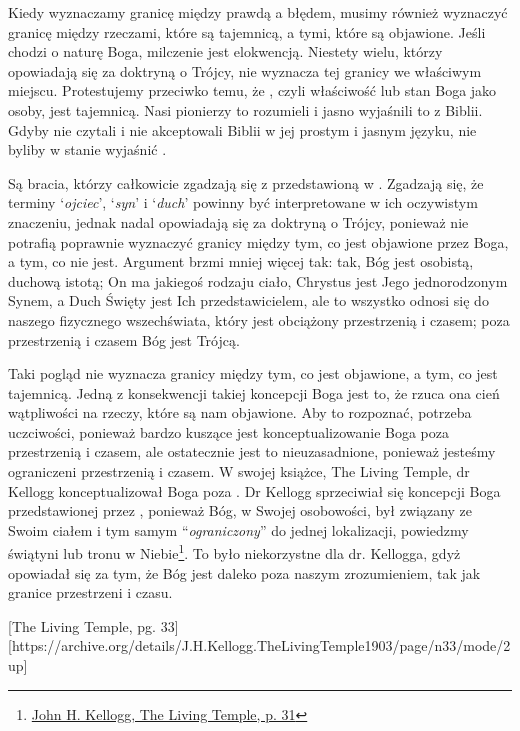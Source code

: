 Kiedy wyznaczamy granicę między prawdą a błędem, musimy również wyznaczyć granicę między rzeczami, które są tajemnicą, a tymi, które są objawione. Jeśli chodzi o naturę Boga, milczenie jest elokwencją. Niestety wielu, którzy opowiadają się za doktryną o Trójcy, nie wyznacza tej granicy we właściwym miejscu. Protestujemy przeciwko temu, że , czyli właściwość lub stan Boga jako osoby, jest tajemnicą. Nasi pionierzy to rozumieli i jasno wyjaśnili to z Biblii. Gdyby nie czytali i nie akceptowali Biblii w jej prostym i jasnym języku, nie byliby w stanie wyjaśnić .

Są bracia, którzy całkowicie zgadzają się z  przedstawioną w . Zgadzają się, że terminy ‘\textit{ojciec}’, ‘\textit{syn}’ i ‘\textit{duch}’ powinny być interpretowane w ich oczywistym znaczeniu, jednak nadal opowiadają się za doktryną o Trójcy, ponieważ nie potrafią poprawnie wyznaczyć granicy między tym, co jest objawione przez Boga, a tym, co nie jest. Argument brzmi mniej więcej tak: tak, Bóg jest osobistą, duchową istotą; On ma jakiegoś rodzaju ciało, Chrystus jest Jego jednorodzonym Synem, a Duch Święty jest Ich przedstawicielem, ale to wszystko odnosi się do naszego fizycznego wszechświata, który jest obciążony przestrzenią i czasem; poza przestrzenią i czasem Bóg jest Trójcą.

Taki pogląd nie wyznacza granicy między tym, co jest objawione, a tym, co jest tajemnicą. Jedną z konsekwencji takiej koncepcji Boga jest to, że rzuca ona cień wątpliwości na rzeczy, które są nam objawione. Aby to rozpoznać, potrzeba uczciwości, ponieważ bardzo kuszące jest konceptualizowanie Boga poza przestrzenią i czasem, ale ostatecznie jest to nieuzasadnione, ponieważ jesteśmy ograniczeni przestrzenią i czasem. W swojej książce, The Living Temple, dr Kellogg konceptualizował Boga poza . Dr Kellogg sprzeciwiał się koncepcji Boga przedstawionej przez , ponieważ Bóg, w Swojej osobowości, był związany ze Swoim ciałem i tym samym “\textit{ograniczony}” do jednej lokalizacji, powiedzmy świątyni lub tronu w Niebie\footnote{\href{https://archive.org/details/J.H.Kellogg.TheLivingTemple1903/page/n31/mode/2up}{John H. Kellogg, The Living Temple, p. 31}}. To było niekorzystne dla dr. Kellogga, gdyż opowiadał się za tym, że Bóg jest daleko poza naszym zrozumieniem, tak jak granice przestrzeni i czasu.

[The Living Temple, pg. 33][https://archive.org/details/J.H.Kellogg.TheLivingTemple1903/page/n33/mode/2up]

